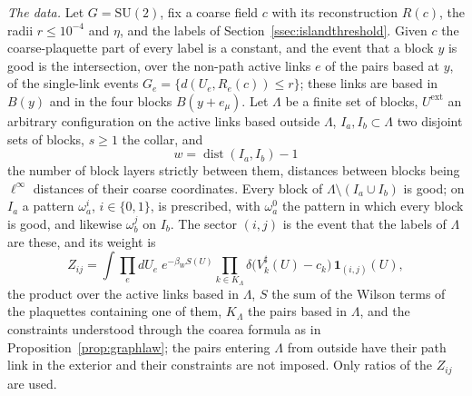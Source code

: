 \documentclass[11pt]{amsart}
\theoremstyle{definition}
\theoremstyle{remark}
\numberwithin{equation}{section}
\newcommand{\SU}{\mathrm{SU}}
\newcommand{\dist}{\operatorname{dist}}
\begin{document}
\emph{The data.} Let $G=\SU(2)$, fix a coarse field $c$ with its
reconstruction $R(c)$, the radii $r\le10^{-4}$ and $\eta$, and the labels
of Section~\ref{ssec:islandthreshold}. Given $c$ the coarse-plaquette part of
every label is a constant, and the event that a block $y$ is good is the
intersection, over the non-path active links $e$ of the pairs based at $y$,
of the single-link events $G_e=\{d(U_e,R_e(c))\le r\}$; these links are
based in $B(y)$ and in the four blocks $B(y+e_\mu)$. Let $\Lambda$ be a
finite set of blocks, $U^{\mathrm{ext}}$ an arbitrary configuration on the
active links based outside $\Lambda$, $I_a,I_b\subset\Lambda$ two disjoint
sets of blocks, $s\ge1$ the collar, and
\[
w=\dist(I_a,I_b)-1
\]
the number of block layers strictly between them, distances between blocks
being $\ell^\infty$ distances of their coarse coordinates. Every block of
$\Lambda\setminus(I_a\cup I_b)$ is good; on $I_a$ a pattern
$\omega_a^i$, $i\in\{0,1\}$, is prescribed, with $\omega_a^0$ the pattern
in which every block is good, and likewise $\omega_b^j$ on $I_b$. The
sector $(i,j)$ is the event that the labels of $\Lambda$ are these, and its
weight is
\[
Z_{ij}=\int\prod_{e}dU_e\;e^{-\beta_WS(U)}\prod_{k\in K_\Lambda}
\delta\bigl(V^\sharp_k(U)-c_k\bigr)\,\mathbf 1_{(i,j)}(U),
\]
the product over the active links based in $\Lambda$, $S$ the sum of the
Wilson terms of the plaquettes containing one of them, $K_\Lambda$ the
pairs based in $\Lambda$, and the constraints understood through the
coarea formula as in Proposition~\ref{prop:graphlaw}; the pairs entering
$\Lambda$ from outside have their path link in the exterior and their
constraints are not imposed. Only ratios of the $Z_{ij}$ are used.
\end{document}
